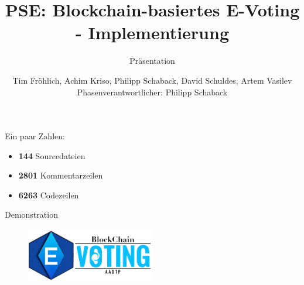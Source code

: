 \documentclass{beamer}
\title[]{PSE: Blockchain-basiertes E-Voting - Implementierung}
\subtitle{Präsentation}
\author{Tim Fröhlich, Achim Kriso, Philipp Schaback, David Schuldes, Artem Vasilev\\ Phasenverantwortlicher: Philipp Schaback}
\institute[]{KARLSRUHER INSTITUT FÜR TECHNOLOGIE (KIT)}
\begin{document}
\begin{frame}

\maketitle

\end{frame}

\begin{frame}{Ein paar Zahlen:}
\begin{itemize}
	\item \textbf{144} Sourcedateien
	\item \textbf{2801} Kommentarzeilen
	\item \textbf{6263} Codezeilen
\end{itemize}
\end{frame}

\begin{frame}
\begin{center}
	\huge Demonstration
	\begin{figure}[h!]
		\includegraphics[width=0.5\textwidth]{pictures/logo}
	\end{figure}
\end{center}
\end{frame}
\end{document}
